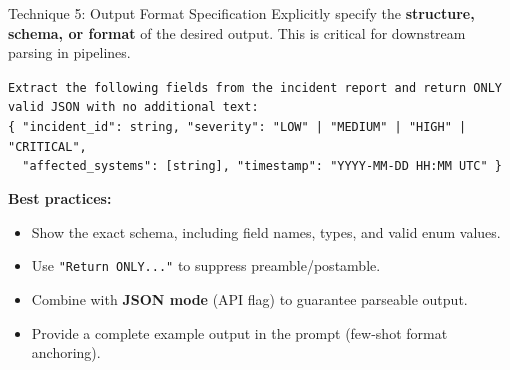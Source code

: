 \documentclass{beamer}
\begin{document}
\begin{frame}{Technique 5: Output Format Specification}
    Explicitly specify the \textbf{structure, schema, or format} of the desired output.
    This is critical for downstream parsing in pipelines.

    \vspace{0.2cm}
    \begin{tcolorbox}[colback=backcolour, colframe=gray!50, title={\small Example: JSON Schema Constraint}]
        \scriptsize
        \texttt{Extract the following fields from the incident report and return ONLY valid JSON
        with no additional text:}\\[2pt]
        \texttt{\{ "incident\_id": string, "severity": "LOW" | "MEDIUM" | "HIGH" | "CRITICAL",}\\
        \texttt{\ \ "affected\_systems": [string], "timestamp": "YYYY-MM-DD HH:MM UTC" \}}
    \end{tcolorbox}

    \vspace{0.1cm}
    \textbf{Best practices:}
    \begin{itemize}
        \item Show the exact schema, including field names, types, and valid enum values.
        \item Use \texttt{"Return ONLY..."} to suppress preamble/postamble.
        \item Combine with \textbf{JSON mode} (API flag) to guarantee parseable output.
        \item Provide a complete example output in the prompt (few-shot format anchoring).
    \end{itemize}
\end{frame}
\end{document}
